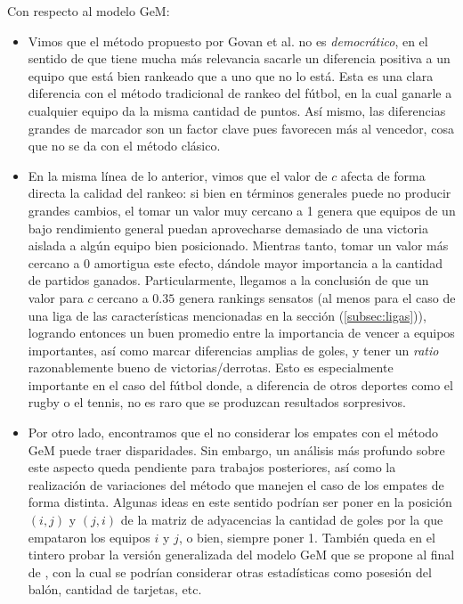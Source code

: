 Con respecto al modelo GeM:
\begin{itemize}
	\item Vimos que el método propuesto por Govan et al. no es \emph{democrático}, en el sentido de que tiene mucha más relevancia sacarle un diferencia positiva a un equipo que está bien rankeado que a uno que no lo está. Esta es una clara diferencia  con el método tradicional de rankeo del fútbol, en la cual ganarle a cualquier equipo da la misma cantidad de puntos. Así mismo, las diferencias grandes de marcador son un factor clave pues favorecen más al vencedor, cosa que no se da con el método clásico.
	\item En la misma línea de lo anterior, vimos que el valor de $c$ afecta de forma directa la calidad del rankeo: si bien en términos generales puede no producir grandes cambios, el tomar un valor muy cercano a 1 genera que equipos de un bajo rendimiento general puedan aprovecharse demasiado de una victoria aislada a algún equipo bien posicionado. Mientras tanto, tomar un valor más cercano a 0 amortigua este efecto, dándole mayor importancia a la cantidad de partidos ganados. Particularmente, llegamos a la conclusión de que un valor para $c$ cercano a $0.35$ genera rankings sensatos (al menos para el caso de una liga de las características mencionadas en la sección (\ref{subsec:ligas})), logrando entonces un buen promedio entre la importancia de vencer a equipos importantes, así como marcar diferencias amplias de goles, y tener un \emph{ratio} razonablemente bueno de victorias/derrotas. Esto es especialmente importante en el caso del fútbol donde, a diferencia de otros deportes como el rugby o el tennis, no es raro que se produzcan resultados sorpresivos.  
	\item Por otro lado, encontramos que el no considerar los empates con el método GeM puede traer disparidades. Sin embargo, un análisis más profundo sobre este aspecto queda pendiente para trabajos posteriores, así como la realización de variaciones del método que manejen el caso de los empates de forma distinta. Algunas ideas en este sentido podrían ser poner en la posición $(i,j)$ y $(j,i)$ de la matriz de adyacencias la cantidad de goles por la que empataron los equipos $i$ y $j$, o bien, siempre poner 1. También queda en el tintero probar la versión generalizada del modelo GeM que se propone al final de \cite{Govan2008}, con la cual se podrían considerar otras estadísticas como posesión del balón, cantidad de tarjetas, etc.
\end{itemize}